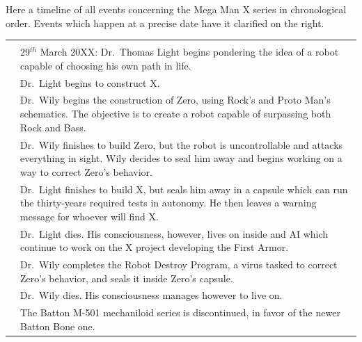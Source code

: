 Here a timeline of all events concerning the Mega Man X series in chronological order. Events which happen at a precise date have it clarified on the right.

\begin{tabularx}{\linewidth}{l X}
	
	\toprule
	\rowcolor{Aquamarine}
	\multicolumn{2}{c}{\textbf{20XX}}\\
	\addlinespace[1.5ex]
	\tabdot&29$^{th}$ March 20XX: Dr.~Thomas Light begins pondering the idea of a robot capable of choosing his own path in life. \\
	\tabdot& Dr.~Light begins to construct X.\\
	\tabdot& Dr.~Wily begins the construction of Zero, using Rock's and Proto Man's schematics. The objective is to create a robot capable of surpassing both Rock and Bass.\\
	\tabdot& Dr.~Wily finishes to build Zero, but the robot is uncontrollable and attacks everything in sight. Wily decides to seal him away and begins working on a way to correct Zero's behavior.\\
	\tabdot& Dr.~Light finishes to build X, but seals him away in a capsule which can run the thirty-years required tests in autonomy. He then leaves a warning message for whoever will find X.\\
	\tabdot& Dr.~Light dies. His consciousness, however, lives on inside and AI which continue to work on the X project developing the First Armor.\\
	\tabdot& Dr.~Wily completes the Robot Destroy Program, a virus tasked to correct Zero's behavior, and seals it inside Zero's capsule.\\
	\tabdot& Dr.~Wily dies. His consciousness manages however to live on.\\
	\tabdot& The Batton M-501 mechaniloid series is discontinued, in favor of the newer Batton Bone one.\\
	

\end{tabularx}
